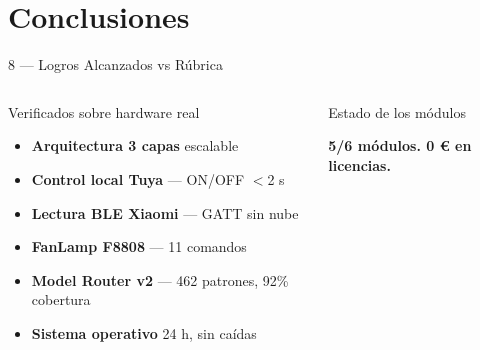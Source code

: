 \section{Conclusiones}

\begin{frame}{8 — Logros Alcanzados vs Rúbrica}
  \hypertarget{s:logros}{}
  \sloppy
  \footnotesize
  \begin{columns}[T]
    \begin{exampleblock}{Verificados sobre hardware real}
      \begin{itemize}
        \item \textbf{Arquitectura 3 capas} escalable
        \item \textbf{Control local Tuya} — ON/OFF $<$2 s
        \item \textbf{Lectura BLE Xiaomi} — GATT sin nube
        \item \textbf{FanLamp F8808} — 11 comandos
        \item \textbf{Model Router v2} — 462 patrones, 92\% cobertura
        \item \textbf{Sistema operativo} 24 h, sin caídas
      \end{itemize}
    \end{exampleblock}

    \begin{block}{Estado de los módulos}

      \vspace{0.15cm}
      \centering
      \textbf{5/6 módulos. 0 € en licencias.}
    \end{block}
  \end{columns}
\end{frame}

